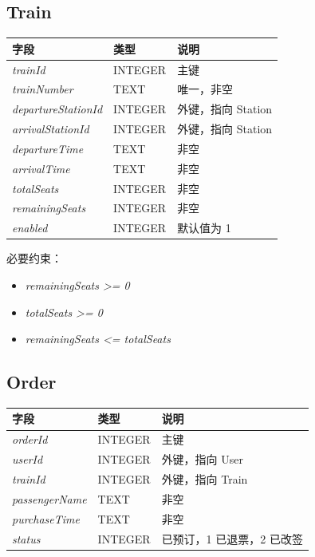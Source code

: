 \documentclass[10pt,twocolumn]{ctexart}
\begin{document}
\subsection*{Train}
\begin{tabular}{>{\raggedright\arraybackslash}p{} >{\raggedright\arraybackslash}p{} >{\raggedright\arraybackslash}p{}}
\toprule
字段 & 类型 & 说明 \\
\midrule
\textit{trainId} & INTEGER & 主键 \\
\textit{trainNumber} & TEXT & 唯一，非空 \\
\textit{departureStationId} & INTEGER & 外键，指向 Station \\
\textit{arrivalStationId} & INTEGER & 外键，指向 Station \\
\textit{departureTime} & TEXT & 非空 \\
\textit{arrivalTime} & TEXT & 非空 \\
\textit{totalSeats} & INTEGER & 非空 \\
\textit{remainingSeats} & INTEGER & 非空 \\
\textit{enabled} & INTEGER & 默认值为 1 \\
\bottomrule
\end{tabular}

必要约束：
\begin{itemize}
  \item \textit{remainingSeats >= 0}
  \item \textit{totalSeats >= 0}
  \item \textit{remainingSeats <= totalSeats}
\end{itemize}

\subsection*{Order}
\begin{tabular}{>{\raggedright\arraybackslash}p{} >{\raggedright\arraybackslash}p{} >{\raggedright\arraybackslash}p{}}
\toprule
字段 & 类型 & 说明 \\
\midrule
\textit{orderId} & INTEGER & 主键 \\
\textit{userId} & INTEGER & 外键，指向 User \\
\textit{trainId} & INTEGER & 外键，指向 Train \\
\textit{passengerName} & TEXT & 非空 \\
\textit{purchaseTime} & TEXT & 非空 \\
\textit{status} & INTEGER & 0 已预订，1 已退票，2 已改签 \\
\bottomrule
\end{tabular}
\end{document}
